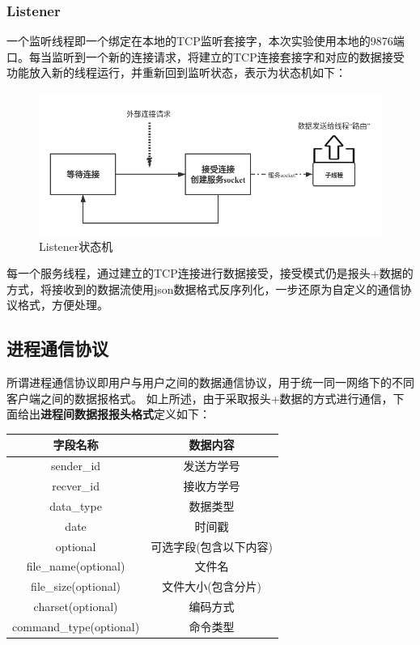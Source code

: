 \documentclass[UTF8]{ctexart}
\begin{document}
\subsubsection{Listener}\label{listener}
一个监听线程即一个绑定在本地的TCP监听套接字，本次实验使用本地的9876端口。每当监听到一个新的连接请求，将建立的TCP连接套接字和对应的数据接受功能放入新的线程运行，并重新回到监听状态，表示为状态机如下：
\begin{figure}[H]
    \centering
    \includegraphics[scale=0.4]{listenerstate.png}
    \caption{Listener状态机}
\end{figure}
每一个服务线程，通过建立的TCP连接进行数据接受，接受模式仍是报头+数据的方式，将接收到的数据流使用json数据格式反序列化，一步还原为自定义的通信协议格式，方便处理。

\subsection{进程通信协议}\label{progress}
所谓进程通信协议即用户与用户之间的数据通信协议，用于统一同一网络下的不同客户端之间的数据报格式。
如上所述，由于采取报头+数据的方式进行通信，下面给出\textbf{进程间数据报报头格式}定义如下：
\begin{table}[H]
    \centering
    \begin{tabular}{cc}
        \hline
        字段名称 & 数据内容 \\
        \hline
        sender\_id & 发送方学号\\
        recver\_id & 接收方学号\\
        data\_type & 数据类型\\
        date & 时间戳\\
        optional & 可选字段(包含以下内容)\\
        file\_name(optional) & 文件名\\
        file\_size(optional) & 文件大小(包含分片)\\
        charset(optional) & 编码方式\\
        command\_type(optional) & 命令类型\\
        \hline
    \end{tabular}
\end{table}
\end{document}
